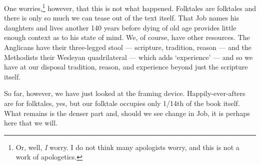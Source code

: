 One worries,\footnote{Or, well, \emph{I} worry. I do not think many apologists worry, and this is not a work of apologetics.} however, that this is not what happened. Folktales are folktales and there is only so much we can tease out of the text itself. That Job names his daughters and lives another 140 years before dying of old age provides little enough context as to his state of mind. We, of course, have other resources. The Anglicans have their three-legged stool --- scripture, tradition, reason --- and the Methodists their Wesleyan quadrilateral --- which adds `experience' --- and so we have at our disposal tradition, reason, and experience beyond just the scripture itself.

So far, however, we have just looked at the framing device. Happily-ever-afters are for folktales, yes, but our folktale occupies only 1/14th of the book itself. What remains is the denser part and, should we see change in Job, it is perhaps here that we will.
